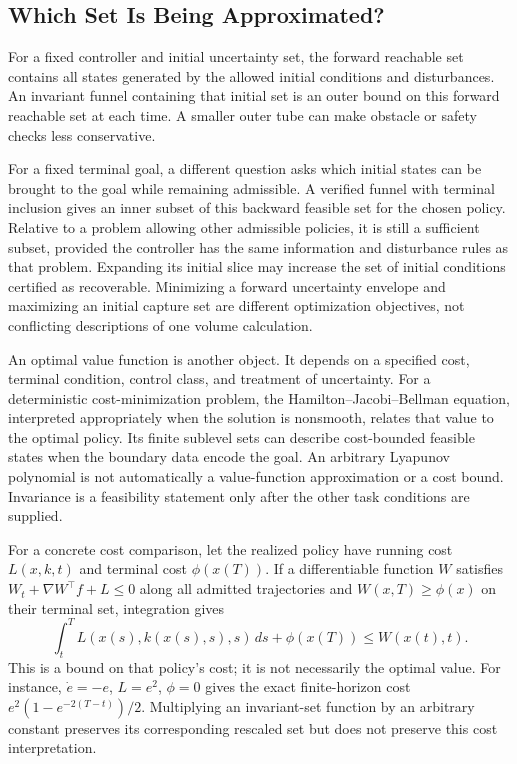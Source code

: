 \documentclass[12pt, openany]{book}
\theoremstyle{plain}
\begin{document}
\subsection{Which Set Is Being Approximated?}

For a fixed controller and initial uncertainty set, the forward reachable set contains all states generated by the allowed initial conditions and disturbances. An invariant funnel containing that initial set is an outer bound on this forward reachable set at each time. A smaller outer tube can make obstacle or safety checks less conservative.

For a fixed terminal goal, a different question asks which initial states can be brought to the goal while remaining admissible. A verified funnel with terminal inclusion gives an inner subset of this backward feasible set for the chosen policy. Relative to a problem allowing other admissible policies, it is still a sufficient subset, provided the controller has the same information and disturbance rules as that problem. Expanding its initial slice may increase the set of initial conditions certified as recoverable. Minimizing a forward uncertainty envelope and maximizing an initial capture set are different optimization objectives, not conflicting descriptions of one volume calculation.

An optimal value function is another object. It depends on a specified cost, terminal condition, control class, and treatment of uncertainty. For a deterministic cost-minimization problem, the Hamilton--Jacobi--Bellman equation, interpreted appropriately when the solution is nonsmooth, relates that value to the optimal policy. Its finite sublevel sets can describe cost-bounded feasible states when the boundary data encode the goal. An arbitrary Lyapunov polynomial is not automatically a value-function approximation or a cost bound. Invariance is a feasibility statement only after the other task conditions are supplied.

For a concrete cost comparison, let the realized policy have running cost $L(x,k,t)$ and terminal cost $\phi(x(T))$. If a differentiable function $W$ satisfies $W_t+\nabla W^\top f+L\leq0$ along all admitted trajectories and $W(x,T)\geq\phi(x)$ on their terminal set, integration gives
\begin{equation}
 \int_t^T L(x(s),k(x(s),s),s)\,ds+\phi(x(T))\leq W(x(t),t).
 \label{eq:funnel_cost_comparison}
\end{equation}
This is a bound on that policy's cost; it is not necessarily the optimal value. For instance, $\dot e=-e$, $L=e^2$, $\phi=0$ gives the exact finite-horizon cost $e^2(1-e^{-2(T-t)})/2$. Multiplying an invariant-set function by an arbitrary constant preserves its corresponding rescaled set but does not preserve this cost interpretation.
\end{document}
